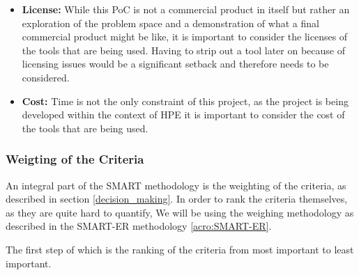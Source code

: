 \begin{itemize}
    \item \textbf{License:}
        \label{crit:license}
        While this \ac{PoC} is not a commercial product in itself but rather an exploration of the problem space and a demonstration of what a final commercial product  might be like,
        it is important to consider the licenses of the tools that are being used.
        Having to strip out a tool later on because of licensing issues would be a significant setback and therefore needs to be considered.

    \item \textbf{Cost:}
        Time is not the only constraint of this project, as the project is being developed within the context of \ac{HPE} it is important to consider the cost of the tools that are being used.

\end{itemize}

\subsubsection{Weigting of the Criteria}

An integral part of the \ac{SMART} methodology is the weighting of the criteria, as described in section \ref{decision_making}.
In order to rank the criteria themselves, as they are quite hard to quantify, 
We will be using the weighing methodology as described in the \ac{SMART-ER} methodology \ref{acro:SMART-ER}.

The first step of which is the ranking of the criteria from most important to least important.

